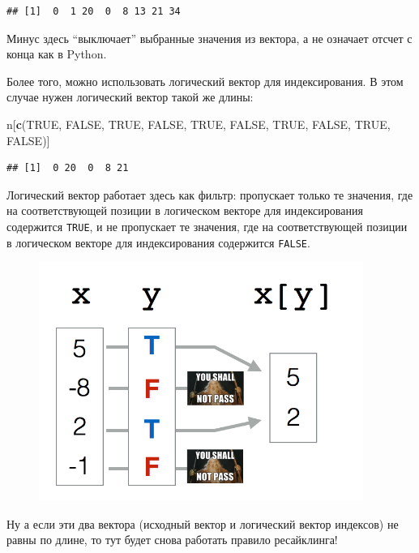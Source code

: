 \documentclass[]{book}
\newenvironment{Shaded}{\begin{snugshade}}{\end{snugshade}}
\newcommand{\KeywordTok}[1]{\textcolor[rgb]{0.13,0.29,0.53}{\textbf{#1}}}
\newcommand{\OtherTok}[1]{\textcolor[rgb]{0.56,0.35,0.01}{#1}}
\newcommand{\NormalTok}[1]{#1}
\begin{document}
\begin{verbatim}
## [1]  0  1 20  0  8 13 21 34
\end{verbatim}

Минус здесь ``выключает'' выбранные значения из вектора, а не означает
отсчет с конца как в Python.

Более того, можно использовать логический вектор для индексирования. В
этом случае нужен логический вектор такой же длины:

\begin{Shaded}
\begin{Highlighting}[]
\NormalTok{n[}\KeywordTok{c}\NormalTok{(}\OtherTok{TRUE}\NormalTok{, }\OtherTok{FALSE}\NormalTok{, }\OtherTok{TRUE}\NormalTok{, }\OtherTok{FALSE}\NormalTok{, }\OtherTok{TRUE}\NormalTok{, }\OtherTok{FALSE}\NormalTok{, }\OtherTok{TRUE}\NormalTok{, }\OtherTok{FALSE}\NormalTok{, }\OtherTok{TRUE}\NormalTok{, }\OtherTok{FALSE}\NormalTok{)]}
\end{Highlighting}
\end{Shaded}

\begin{verbatim}
## [1]  0 20  0  8 21
\end{verbatim}

Логический вектор работает здесь как фильтр: пропускает только те
значения, где на соответствующей позиции в логическом векторе для
индексирования содержится \texttt{TRUE}, и не пропускает те значения,
где на соответствующей позиции в логическом векторе для индексирования
содержится \texttt{FALSE}.

\begin{figure}
\centering
\includegraphics[width=4.16667in]{images/indexgandolf.png}
\caption{}
\end{figure}

Ну а если эти два вектора (исходный вектор и логический вектор индексов)
не равны по длине, то тут будет снова работать правило ресайклинга!
\end{document}
